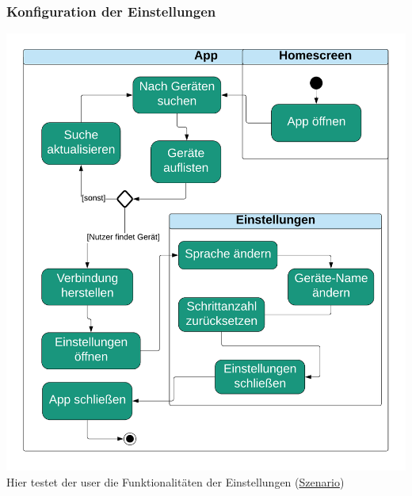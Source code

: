 \documentclass[../pflichtenheft.tex]{subfiles}
\begin{document}
		\subsubsection{Konfiguration der Einstellungen}
		\label{sec:konfig}
			\includegraphics[page=1,width=400pt,keepaspectratio]{../graphics/UML/Konfiguration_der_Einstellungen.png}
			Hier testet der \Gls{user} die Funktionalitäten der Einstellungen (\hyperref[sec:konfigS]{Szenario})
\end{document}
